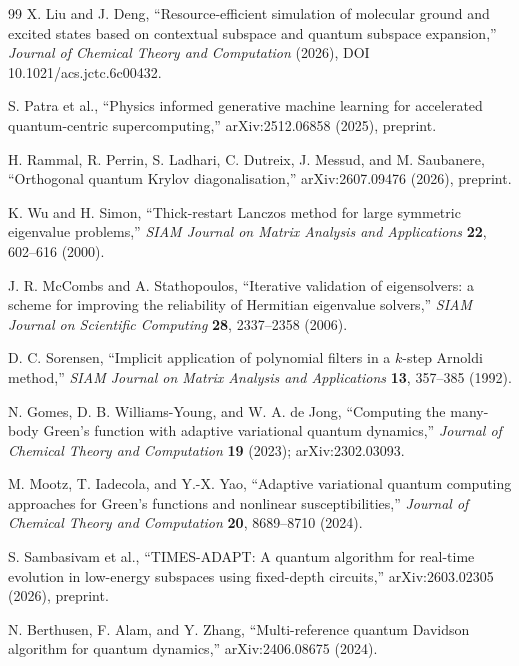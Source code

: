 \documentclass[
  reprint,
  amsmath,
  amssymb,
  aps,
  pra,
  nofootinbib,
  superscriptaddress,
  floatfix
]{revtex4-2}
\begin{document}
\begin{thebibliography}{99}
X. Liu and J. Deng,
``Resource-efficient simulation of molecular ground and excited states based on contextual subspace and quantum subspace expansion,''
\emph{Journal of Chemical Theory and Computation} (2026), DOI 10.1021/acs.jctc.6c00432.

S. Patra et al.,
``Physics informed generative machine learning for accelerated quantum-centric supercomputing,''
arXiv:2512.06858 (2025), preprint.

H. Rammal, R. Perrin, S. Ladhari, C. Dutreix, J. Messud, and M. Saubanere,
``Orthogonal quantum Krylov diagonalisation,''
arXiv:2607.09476 (2026), preprint.

K. Wu and H. Simon,
``Thick-restart Lanczos method for large symmetric eigenvalue problems,''
\emph{SIAM Journal on Matrix Analysis and Applications} \textbf{22}, 602--616 (2000).

J. R. McCombs and A. Stathopoulos,
``Iterative validation of eigensolvers: a scheme for improving the reliability of Hermitian eigenvalue solvers,''
\emph{SIAM Journal on Scientific Computing} \textbf{28}, 2337--2358 (2006).

D. C. Sorensen,
``Implicit application of polynomial filters in a $k$-step Arnoldi method,''
\emph{SIAM Journal on Matrix Analysis and Applications} \textbf{13}, 357--385 (1992).

N. Gomes, D. B. Williams-Young, and W. A. de Jong,
``Computing the many-body Green's function with adaptive variational quantum dynamics,''
\emph{Journal of Chemical Theory and Computation} \textbf{19} (2023); arXiv:2302.03093.

M. Mootz, T. Iadecola, and Y.-X. Yao,
``Adaptive variational quantum computing approaches for Green's functions and nonlinear susceptibilities,''
\emph{Journal of Chemical Theory and Computation} \textbf{20}, 8689--8710 (2024).

S. Sambasivam et al.,
``TIMES-ADAPT: A quantum algorithm for real-time evolution in low-energy subspaces using fixed-depth circuits,''
arXiv:2603.02305 (2026), preprint.

N. Berthusen, F. Alam, and Y. Zhang,
``Multi-reference quantum Davidson algorithm for quantum dynamics,''
arXiv:2406.08675 (2024).

\end{thebibliography}
\end{document}
